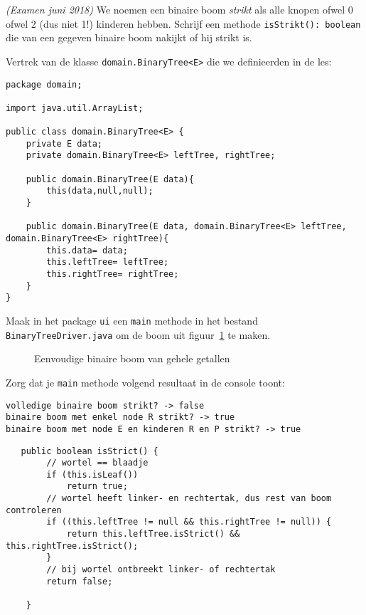 \begin{oef}
\code \emph{(Examen juni 2018)} We noemen een binaire boom \emph{strikt} als alle knopen ofwel 0 ofwel 2 (dus niet 1!) kinderen hebben. Schrijf een methode \verb+isStrikt(): boolean+ die van een gegeven binaire boom nakijkt of hij strikt is. 

Vertrek van de klasse \verb+domain.BinaryTree<E>+ die we definieerden in de les:
\begin{lstlisting}	
package domain;

import java.util.ArrayList;

public class domain.BinaryTree<E> {
	private E data;
	private domain.BinaryTree<E> leftTree, rightTree;
	
	public domain.BinaryTree(E data){
		this(data,null,null);
	}
	
	public domain.BinaryTree(E data, domain.BinaryTree<E> leftTree, domain.BinaryTree<E> rightTree){
		this.data= data;
		this.leftTree= leftTree;
		this.rightTree= rightTree;
	}
}
\end{lstlisting}

Maak in het package \verb+ui+ een \verb+main+ methode in het bestand \verb+BinaryTreeDriver.java+ om de boom uit figuur~\ref{fig:boom1exjuni19} te maken.
\begin{figure}[htbp]
    \centering
{}
\caption{Eenvoudige binaire boom van gehele getallen}
    \label{fig:boom1exjuni19}
\end{figure}

Zorg dat je \verb+main+ methode volgend resultaat in de console toont:
\begin{verbatim}
volledige binaire boom strikt? -> false
binaire boom met enkel node R strikt? -> true
binaire boom met node E en kinderen R en P strikt? -> true
\end{verbatim}
\begin{opl}
\begin{lstlisting}
   public boolean isStrict() {
        // wortel == blaadje
        if (this.isLeaf())
            return true;
        // wortel heeft linker- en rechtertak, dus rest van boom controleren
        if ((this.leftTree != null && this.rightTree != null)) {
            return this.leftTree.isStrict() && this.rightTree.isStrict();
        }
        // bij wortel ontbreekt linker- of rechtertak
        return false;

    }
    \end{lstlisting}
\end{opl}
\end{oef}




